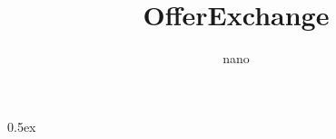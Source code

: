 \documentclass[11pt,a4paper]{article}
\begin{document}
\title{OfferExchange}
\author{nano}
\maketitle

\tableofcontents
\clearpage
{}

\parindent 0pt\parskip 0.5ex

\setlength{\emergencystretch}{3em}



%
%
\end{document}
